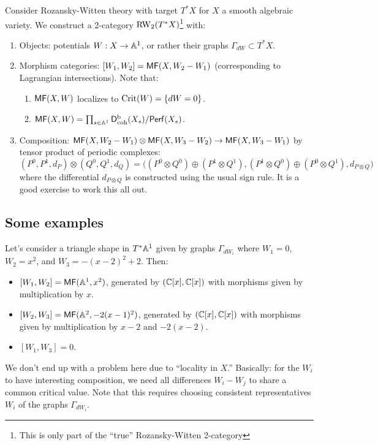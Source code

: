 \documentclass{article}
\begin{document}
Consider Rozansky-Witten theory with target $T^* X$ for $X$ a smooth algebraic variety.
We construct a 2-category $\RW_2(T^*X)$\footnote{This is only part of the ``true'' Rozansky-Witten 2-category} with:
\begin{enumerate}
	\item Objects: potentials $W: X \to \AA^1$, or rather their graphs $\Gamma_{dW} \subset T^* X$.
	\item Morphism categories: $[W_1, W_2] = \MF(X, W_2 - W_1)$ (corresponding to Lagrangian intersections).
		Note that:
		\begin{enumerate}
			\item $\MF(X, W)$ localizes to $\Crit(W) = \{ dW = 0 \}$.
			\item $\MF(X, W) = \prod_{s \in \AA^1} \Dbcoh(X_s) / \Perf(X_s)$.
		\end{enumerate}
	\item Composition: $\MF(X, W_2 - W_1) \otimes \MF(X, W_3 - W_2) \to \MF(X, W_3 - W_1)$ by tensor product of periodic complexes:
		\[
			(P^0, P^1, d_P) \otimes (Q^0, Q^1, d_Q) = \big((P^0 \otimes Q^0) \oplus (P^1 \otimes Q^1), (P^1 \otimes Q^0) \oplus (P^0 \otimes Q^1), d_{P \otimes Q}\big)
		\]
		where the differential $d_{P \otimes Q}$ is constructed using the usual sign rule.
		It is a good exercise to work this all out.
\end{enumerate}

\subsection{Some examples}

\begin{ex}
	Let's consider a triangle shape in $T^* \AA^1$ given by graphs $\Gamma_{dW_i}$ where $W_1 = 0$, $W_2 = x^2$, and $W_3 = -(x - 2)^2 + 2$.
	Then:
	\begin{itemize}
		\item $[W_1, W_2] = \MF(\AA^1, x^2)$, generated by $(\CC[x], \CC[x])$ with morphisms given by multiplication by $x$.
		\item $[W_2, W_3] = \MF(\AA^2, -2(x - 1)^2)$, generated by $(\CC[x], \CC[x])$ with morphisms given by multiplication by $x - 2$ and $-2(x - 2)$.
		\item $[W_1, W_3] = 0$.
	\end{itemize}
	We don't end up with a problem here due to ``locality in $X$.''
	Basically: for the $W_i$ to have interesting composition, we need all differences $W_i - W_j$ to share a common critical value.
	Note that this requires choosing consistent representatives $W_i$ of the graphs $\Gamma_{dW_i}$.
\end{ex}
\end{document}
